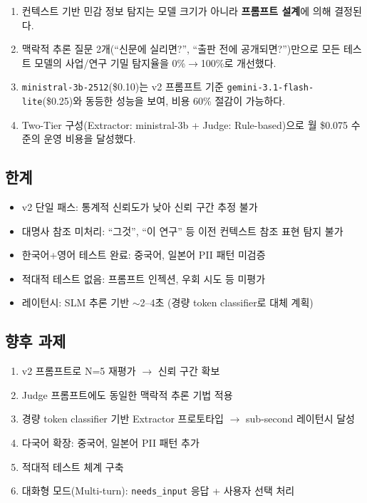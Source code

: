 \documentclass[11pt,a4paper]{article}
\begin{document}
\begin{enumerate}[nosep]
  \item 컨텍스트 기반 민감 정보 탐지는 모델 크기가 아니라 \textbf{프롬프트 설계}에 의해 결정된다.
  \item 맥락적 추론 질문 2개(``신문에 실리면?'', ``출판 전에 공개되면?'')만으로 모든 테스트 모델의 사업/연구 기밀 탐지율을 0\%$\rightarrow$100\%로 개선했다.
  \item \texttt{ministral-3b-2512}(\$0.10)는 v2 프롬프트 기준 \texttt{gemini-3.1-flash-lite}(\$0.25)와 동등한 성능을 보여, 비용 60\% 절감이 가능하다.
  \item Two-Tier 구성(Extractor: ministral-3b + Judge: Rule-based)으로 월 \$0.075 수준의 운영 비용을 달성했다.
\end{enumerate}

\subsection{한계}

\begin{itemize}[nosep]
  \item v2 단일 패스: 통계적 신뢰도가 낮아 신뢰 구간 추정 불가
  \item 대명사 참조 미처리: ``그것'', ``이 연구'' 등 이전 컨텍스트 참조 표현 탐지 불가
  \item 한국어+영어 테스트 완료: 중국어, 일본어 PII 패턴 미검증
  \item 적대적 테스트 없음: 프롬프트 인젝션, 우회 시도 등 미평가
  \item 레이턴시: SLM 추론 기반 $\sim$2--4초 (경량 token classifier로 대체 계획)
\end{itemize}

\subsection{향후 과제}

\begin{enumerate}[nosep]
  \item v2 프롬프트로 N=5 재평가 $\rightarrow$ 신뢰 구간 확보
  \item Judge 프롬프트에도 동일한 맥락적 추론 기법 적용
  \item 경량 token classifier 기반 Extractor 프로토타입 $\rightarrow$ sub-second 레이턴시 달성
  \item 다국어 확장: 중국어, 일본어 PII 패턴 추가
  \item 적대적 테스트 체계 구축
  \item 대화형 모드(Multi-turn): \texttt{needs\_input} 응답 + 사용자 선택 처리
\end{enumerate}
\end{document}
